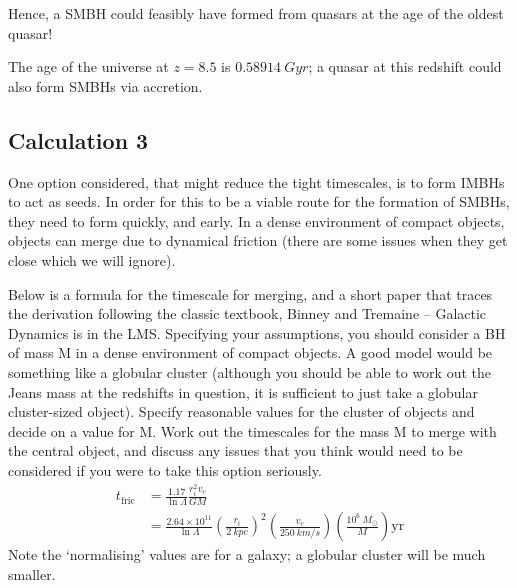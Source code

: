 \documentclass[a4paper]{article} %
\begin{document}
Hence, a SMBH could feasibly have formed from quasars at the age of the oldest quasar!

The age of the universe at $z=8.5$ is $\SI{0.58914}{Gyr}$; a quasar at this redshift could also form SMBHs via accretion.




\subsection{Calculation 3}
\begin{framed}
One option considered, that might reduce the tight timescales, is to form IMBHs to act as seeds. In order for this to be a viable route for the formation of SMBHs, they need to form quickly, and early. In a dense environment of compact objects, objects can merge due to dynamical friction (there are some issues when they get close which we will ignore).

Below is a formula for the timescale for merging, and a short paper that traces the derivation following the classic textbook, Binney and Tremaine – Galactic Dynamics is in the LMS. Specifying your assumptions, you should consider a BH of mass M in a dense environment of compact objects. A good model would be something like a globular cluster (although you should be able to work out the Jeans mass at the redshifts in question, it is sufficient to just take a globular cluster-sized object). Specify reasonable values for the cluster of objects and decide on a value for M. Work out the timescales for the mass M to merge with the central object, and discuss any issues that you think would need to be considered if you were to take this option seriously.
\begin{align}
t_{\text{fric}}&=\frac{1.17}{\ln \Lambda}\frac{r_i^2 v_c}{GM}\\
&=\frac{2.64\times 10^{11}}{\ln \Lambda}\left(\frac{r_i}{\SI{2}{kpc}}\right)^2\left(\frac{v_c}{\SI{250}{km/s}}\right)\left(\frac{10^6~M_{\odot}}{M}\right)\text{yr}
\end{align}
Note the ‘normalising’ values are for a galaxy; a globular cluster will be much smaller.
\end{framed}
\end{document}
